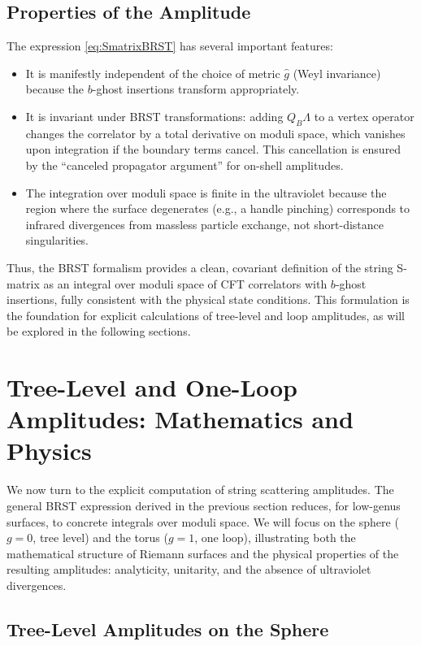 \documentclass[11pt]{article}
\begin{document}
\subsection{Properties of the Amplitude}

The expression \eqref{eq:SmatrixBRST} has several important features:
\begin{itemize}
\item It is manifestly independent of the choice of metric $\hat{g}$ (Weyl invariance) because the $b$-ghost insertions transform appropriately.
\item It is invariant under BRST transformations: adding $Q_B\Lambda$ to a vertex operator changes the correlator by a total derivative on moduli space, which vanishes upon integration if the boundary terms cancel. This cancellation is ensured by the ``canceled propagator argument'' for on-shell amplitudes.
\item The integration over moduli space is finite in the ultraviolet because the region where the surface degenerates (e.g., a handle pinching) corresponds to infrared divergences from massless particle exchange, not short-distance singularities.
\end{itemize}

Thus, the BRST formalism provides a clean, covariant definition of the string S-matrix as an integral over moduli space of CFT correlators with $b$-ghost insertions, fully consistent with the physical state conditions. This formulation is the foundation for explicit calculations of tree-level and loop amplitudes, as will be explored in the following sections.

\section{Tree-Level and One-Loop Amplitudes: Mathematics and Physics}

We now turn to the explicit computation of string scattering amplitudes. The general BRST expression derived in the previous section reduces, for low-genus surfaces, to concrete integrals over moduli space. We will focus on the sphere ($g=0$, tree level) and the torus ($g=1$, one loop), illustrating both the mathematical structure of Riemann surfaces and the physical properties of the resulting amplitudes: analyticity, unitarity, and the absence of ultraviolet divergences.

\subsection{Tree-Level Amplitudes on the Sphere}
\end{document}
